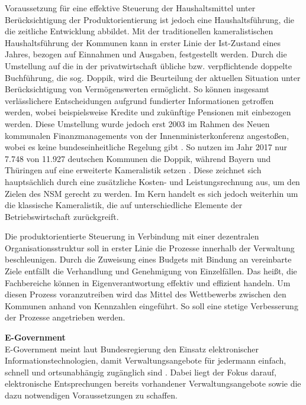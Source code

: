 Voraussetzung für eine effektive Steuerung der Haushaltsmittel unter Berücksichtigung der Produktorientierung ist jedoch eine Haushaltsführung, die die zeitliche Entwicklung abbildet.
Mit der traditionellen kameralistischen Haushaltsführung der Kommunen kann in erster Linie der Ist-Zustand eines Jahres, bezogen auf Einnahmen und Ausgaben, festgestellt werden.
Durch die Umstellung auf die in der privatwirtschaft übliche bzw. verpflichtende doppelte Buchführung, die sog. Doppik, wird die Beurteilung der aktuellen Situation unter Berücksichtigung von Vermögenswerten ermöglicht.
So können insgesamt verlässlichere Entscheidungen aufgrund fundierter Informationen getroffen werden, wobei beispielsweise Kredite und zukünftige Pensionen mit einbezogen werden.
Diese Umstellung wurde jedoch erst 2003 im Rahmen des Neuen kommunalen Finanzmanagements von der Innenministerkonferenz angestoßen, wobei es keine bundeseinheitliche Regelung gibt \citep[][]{Bogumil2017}.
So nutzen im Jahr 2017 nur 7.748 von 11.927 deutschen Kommunen die Doppik, während Bayern und Thüringen auf eine erweiterte Kameralistik setzen \citep[][]{Burth2017}.
Diese zeichnet sich hauptsächlich durch eine zusätzliche Kosten- und Leistungsrechnung aus, um den Zielen des NSM gerecht zu werden.
Im Kern handelt es sich jedoch weiterhin um die klassische Kameralistik, die auf unterschiedliche Elemente der Betriebswirtschaft zurückgreift.

Die produktorientierte Steuerung in Verbindung mit einer dezentralen Organisationsstruktur soll in erster Linie die Prozesse innerhalb der Verwaltung beschleunigen.
Durch die Zuweisung eines Budgets mit Bindung an vereinbarte Ziele entfällt die Verhandlung und Genehmigung von Einzelfällen.
Das heißt, die Fachbereiche können in Eigenverantwortung effektiv und effizient handeln.
Um diesen Prozess voranzutreiben wird das Mittel des Wettbewerbs zwischen den Kommunen anhand von Kennzahlen eingeführt.
So soll eine stetige Verbesserung der Prozesse angetrieben werden.

\textbf{E-Government}\\
E-Government meint laut Bundesregierung den \glqq{}Einsatz elektronischer Informationstechnologien, damit Verwaltungsangebote für jedermann einfach, schnell und ortsunabhängig zugänglich sind\grqq{} \citep[][]{Bundesregierung2023}.
Dabei liegt der Fokus darauf, elektronische Entsprechungen bereits vorhandener Verwaltungsangebote sowie die dazu notwendigen Voraussetzungen zu schaffen.

